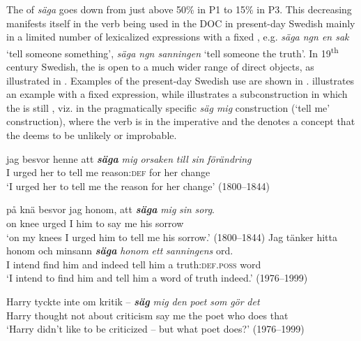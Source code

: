 \documentclass[output=paper]{langscibook}
\begin{document}
The  of \textit{säga} goes down from just above 50\% in P1 to 15\% in P3. This decreasing  manifests itself in the verb being used in the DOC in present-day Swedish mainly in a limited number of lexicalized expressions with a fixed , e.g. \textit{säga ngn en sak} ‘tell someone something’, \textit{säga ngn sanningen} ‘tell someone the truth’. In 19\textsuperscript{th} century Swedish, the  is open to a much wider range of direct objects, as illustrated in . Examples of the present-day Swedish use are shown in .  illustrates an example with a fixed expression, while  illustrates a subconstruction in which the  is still , viz. in the pragmatically specific \textit{säg mig} construction (‘tell me’ construction), where the verb is in the imperative and the  denotes a concept that the  deems to be unlikely or improbable.\largerpage[-1]


\ea \label{ex:valdeson:14}
\ea
\gll jag besvor   henne  att \textbf{\textit{säga}} \textit{mig} \textit{orsaken}    \textit{till}     \textit{sin}  \textit{förändring}\\
      I      urged     her       to     tell   me  reason:\textsc{def} for     her     change\\
\glt  ‘I urged her to tell me the reason for her change’ (1800–1844)

\ex
\gll på    knä  besvor  jag  honom,  att \textbf{\textit{säga}} \textit{mig}   \textit{sin}   \textit{sorg}.\\
      on    knee   urged   I       him     to     say   me   his   sorrow\\
     \glt ‘on my knees I urged him to tell me his sorrow.’ (1800–1844)
\z
\ex \label{ex:valdeson:15}
\ea \label{ex:valdeson:15a}\gll Jag tänker hitta    honom    och  minsann \textbf{\textit{säga}} \textit{honom} \textit{ett}    \textit{sanningens}    ord.\\
      I      intend    find    him      and    indeed    tell      him a       truth:\textsc{def.poss}  word\\
\glt ‘I intend to find him and tell him a word of truth indeed.’ (1976–1999)

\ex \label{ex:valdeson:15b}\gll Harry  tyckte     inte  om    kritik  –  \textbf{\textit{säg}} \textit{mig}  \textit{den}  \textit{poet}  \textit{som}  \textit{gör}  \textit{det}  \\
        Harry    thought    not    about    criticism {} say   me    the    poet    who    does  that\\
\glt ‘Harry didn’t like to be criticized – but what poet does?’ (1976–1999)
\z
\z
\end{document}
